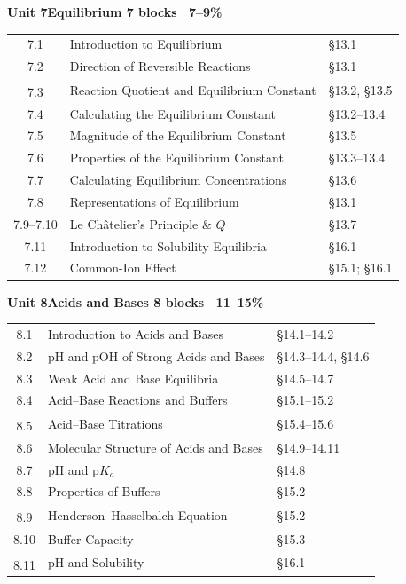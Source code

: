 \documentclass[10pt]{article}
\makeatletter
\newcommand{\uband}[3]{%
  \par\vspace{1pt}\noindent
  \colorbox{apclight}{\begin{minipage}{\dimexpr\linewidth-2\fboxsep\relax}
    \sffamily\bfseries\footnotesize\color{apcaccent}Unit #1\quad#2%
    \hfill\normalfont\footnotesize\color{apcgray}#3
  \end{minipage}}\par\vspace{1pt}%
}
\newcommand{\dg}{\textsuperscript{\dag}}
\newenvironment{utab}{\begin{tabular}{@{}C@{\hspace{2pt}}T@{\hspace{2pt}}Z@{}}}{\end{tabular}\par}
\makeatother
\begin{document}
\hfill
\begin{minipage}[t]{3.28in}

\uband{7}{Equilibrium}{7 blocks \textbullet\ 7--9\%}
\begin{utab}
7.1 & Introduction to Equilibrium & \S13.1\\
7.2 & Direction of Reversible Reactions & \S13.1\\
7.3\dg & Reaction Quotient and Equilibrium Constant & \S13.2, \S13.5\\
7.4 & Calculating the Equilibrium Constant & \S13.2--13.4\\
7.5 & Magnitude of the Equilibrium Constant & \S13.5\\
7.6 & Properties of the Equilibrium Constant & \S13.3--13.4\\
7.7 & Calculating Equilibrium Concentrations & \S13.6\\
7.8 & Representations of Equilibrium & \S13.1\\
7.9--7.10 & Le Ch\^{a}telier's Principle \& $Q$ & \S13.7\\
7.11 & Introduction to Solubility Equilibria & \S16.1\\
7.12 & Common-Ion Effect & \S15.1; \S16.1\\
\end{utab}

\uband{8}{Acids and Bases}{8 blocks \textbullet\ \textbf{11--15\%}}
\begin{utab}
8.1 & Introduction to Acids and Bases & \S14.1--14.2\\
8.2 & pH and pOH of Strong Acids and Bases & \S14.3--14.4, \S14.6\\
8.3 & Weak Acid and Base Equilibria & \S14.5--14.7\\
8.4 & Acid--Base Reactions and Buffers & \S15.1--15.2\\
8.5\dg & Acid--Base Titrations & \S15.4--15.6\\
8.6 & Molecular Structure of Acids and Bases & \S14.9--14.11\\
8.7 & pH and p$K_a$ & \S14.8\\
8.8 & Properties of Buffers & \S15.2\\
8.9\dg & Henderson--Hasselbalch Equation & \S15.2\\
8.10 & Buffer Capacity & \S15.3\\
8.11\dg & pH and Solubility & \S16.1\\
\end{utab}


\end{minipage}
\end{document}

